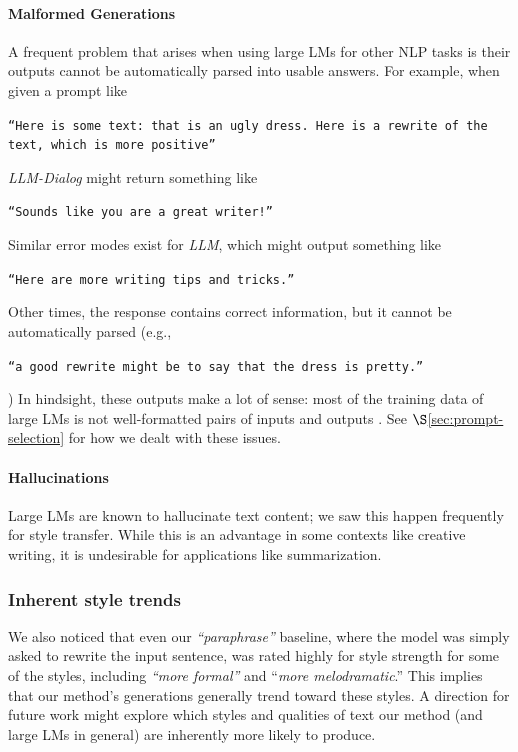 \paragraph{Malformed Generations} A frequent problem that arises when using large LMs for other NLP tasks is their outputs cannot be automatically parsed into usable answers. For example, when given a prompt like \begin{small}
 \texttt{``Here is some text: {that is an ugly dress}. Here is a rewrite of the text, which is more positive''} \end{small}
 \textit{LLM-Dialog} might return something like \begin{small}
 \texttt{``Sounds like you are a great writer!''} \end{small} Similar error modes exist for \textit{LLM}, which might output something like \begin{small}
 \texttt{``Here are more writing tips and tricks.''} \end{small} Other times, the response contains correct information, but it cannot be automatically parsed (e.g., \begin{small}
 \texttt{``a good rewrite might be to say that the dress is pretty.''} \end{small}) In hindsight, these outputs make a lot of sense: most of the training data of large LMs is not well-formatted pairs of inputs and outputs  \citep{reynolds2021prompt}. See $\S$\ref{sec:prompt-selection} for how we dealt with these issues.

\paragraph{Hallucinations} Large LMs are known to hallucinate text content; we saw this happen frequently for style transfer. While this is an advantage in some contexts like creative writing, it is undesirable for applications like summarization. 
\subsubsection{Inherent style trends} We also noticed that even our \textit{``paraphrase''} baseline, where the model was simply asked to rewrite the input sentence, was rated highly for style strength for some of the styles, including \textit{``more formal''} and ``\textit{more melodramatic}.''
This implies that our method's generations generally trend toward these styles.
A direction for future work might explore which styles and qualities of text our method (and large LMs in general) are inherently more likely to produce.

